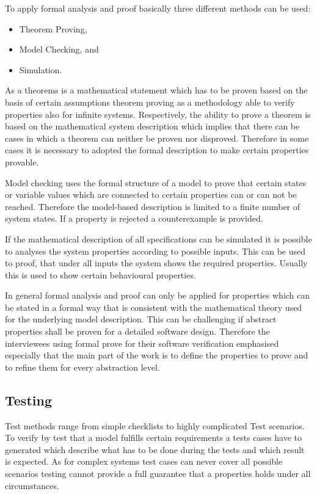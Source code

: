 \documentclass{./template/openetcs2}
\begin{document}
To apply formal analysis and proof basically three different methods can be used: 

\vspace{-10pt}
\begin{itemize}[topsep=2pt, partopsep=2pt,itemsep=2pt,parsep=2pt]
\item Theorem Proving,	
\item Model Checking, and
\item Simulation.	
\end{itemize}

As a theorems is a mathematical statement which has to be proven based on the basis of certain assumptions theorem proving as a methodology able to verify properties also for infinite systems. Respectively, the ability to prove a theorem is based on the mathematical system description which implies that there can be cases in which a theorem can neither be proven nor disproved. Therefore in some cases it is necessary to adopted the formal description to make certain properties provable.

Model checking uses the formal structure of a model to prove that certain states or variable values which are connected to certain properties can or can not be reached. Therefore the model-based description is limited to a finite number of system states. If a property is rejected a counterexample is provided.

If the mathematical description of all specifications can be simulated it is possible to analyses the system properties according to possible inputs. This can be used to proof, that under all inputs the system shows the required properties. Usually this is used to show certain behavioural properties.

In general  formal analysis and proof can only be applied for properties which can be stated in a formal way that is consistent with the mathematical theory used for the underlying model description. This can be challenging if abstract properties shall be proven for a detailed software design. Therefore the interviewees using formal prove for their software verification emphasised especially that the main part of the work is to define the properties to prove and to refine them for every abstraction level.

\subsection{Testing}

Test methods range from simple checklists to highly complicated Test scenarios. To verify by test that a model fulfills certain requirements a tests cases have to generated which describe what has to be done during the tests and which result is expected. As for complex systems test cases can never cover all possible scenarios testing cannot provide a full guarantee that a properties holds under all circumstances.
\end{document}
